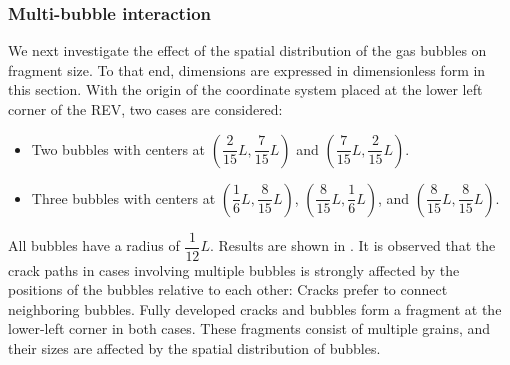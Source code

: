 \subsubsection{Multi-bubble interaction}

We next investigate the effect of the spatial distribution of the gas bubbles on fragment size. To that end, dimensions are expressed in dimensionless form in this section. With the origin of the coordinate system placed at the lower left corner of the REV, two cases are considered:
\begin{itemize}
  \item Two bubbles with centers at $\left( \dfrac{2}{15}L, \dfrac{7}{15}L \right)$ and $\left( \dfrac{7}{15}L, \dfrac{2}{15}L \right)$.
  \item Three bubbles with centers at $\left( \dfrac{1}{6}L, \dfrac{8}{15}L \right)$, $\left( \dfrac{8}{15}L, \dfrac{1}{6}L \right)$, and $\left( \dfrac{8}{15}L, \dfrac{8}{15}L \right)$.
\end{itemize}
All bubbles have a radius of $\dfrac{1}{12}L$. Results are shown in . It is observed that the crack paths in cases involving multiple bubbles is strongly affected by the positions of the bubbles relative to each other: Cracks prefer to connect neighboring bubbles. Fully developed cracks and bubbles form a fragment at the lower-left corner in both cases. These fragments consist of multiple grains, and their sizes are affected by the spatial distribution of bubbles.

